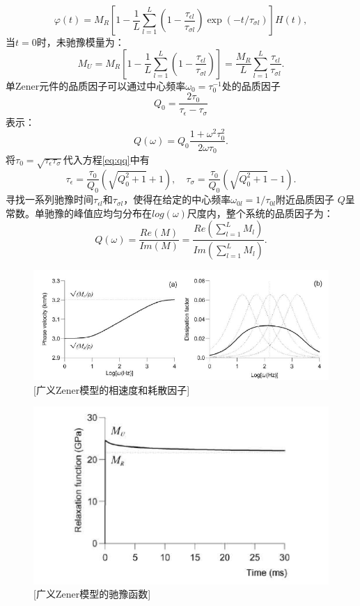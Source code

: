 \begin{equation}
	\varphi(t)=M_R[1-\frac{1}{L}\sum_{l=1}^{L}(1-\frac{\tau_{\epsilon l}}{\tau_{\sigma l}})
	\exp(-t/\tau_{\sigma l})]H(t),
\end{equation}
当$t=0$时，未驰豫模量为：
\begin{equation}
	M_U=M_R[1-\frac{1}{L}\sum_{l=1}^{L}(1-\frac{\tau_{\epsilon l}}{\tau_{\sigma l}})]
	=\frac{M_R}{L}\sum_{l=1}^{L}\frac{\tau_{\epsilon l}}{\tau_{\sigma l}}.
\end{equation}
单Zener元件的品质因子可以通过中心频率$\omega_0=\tau_0^{-1}$处的品质因子
\begin{equation}
	Q_0=\frac{2\tau_0}{\tau_\epsilon-\tau_\sigma}
	\label{eq:qq}
\end{equation}
表示：
\begin{equation}
	Q(\omega)=Q_0\frac{1+\omega^2\tau_0^2}{2\omega\tau_0}.
\end{equation}
将$\tau_0=\sqrt{\tau_\epsilon\tau_\sigma}$代入方程\ref{eq:qq}中有
\begin{equation}
	\tau_\epsilon=\frac{\tau_0}{Q_0}(\sqrt{Q_0^2+1}+1), \quad \tau_\sigma=\frac{\tau_0}{Q_0}(\sqrt{Q_0^2+1}-1).
\end{equation}
寻找一系列驰豫时间$\tau_{\epsilon l}$和$\tau_{\sigma l}$，使得在给定的中心频率$\omega_{0l}=1/\tau_{0l}$附近品质因子
$Q$呈常数。单驰豫的峰值应均匀分布在$log(\omega)$尺度内，整个系统的品质因子为：
\begin{equation}
	Q(\omega)=\frac{Re(M)}{Im(M)}=\frac{Re(\sum_{l=1}^{L}M_l)}{Im(\sum_{l=1}^{L}M_l)}.
\end{equation}
\begin{figure}[!htbp]
	    \centering
		\includegraphics[width=0.8\linewidth]{figure/zener_vp}
		[广义Zener模型的相速度和耗散因子]
		\label{fig:zener_vp}
\end{figure}
\begin{figure}[!htbp]
	    \centering
		\includegraphics[width=0.7\linewidth]{figure/zener_rela}
		[广义Zener模型的驰豫函数]
		\label{fig:zener_rela}
\end{figure}
